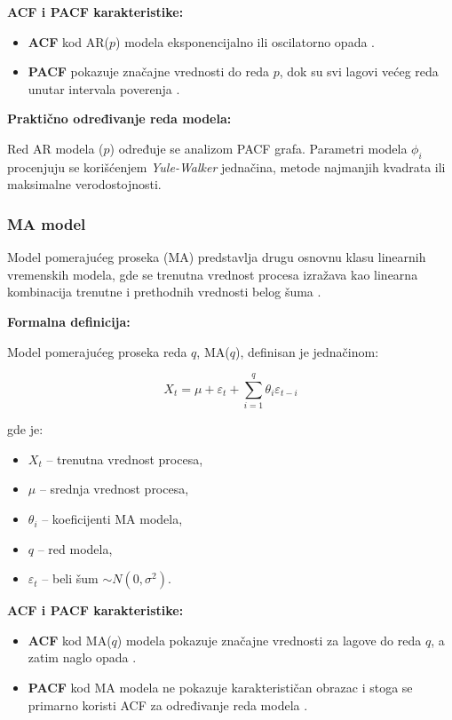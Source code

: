\documentclass[12pt]{article}
\begin{document}
\noindent\textbf{ACF i PACF karakteristike:}

\begin{itemize}
    \item \textbf{ACF} kod AR($p$) modela eksponencijalno ili oscilatorno opada \cite{box1970}.
    \item \textbf{PACF} pokazuje značajne vrednosti do reda $p$, dok su svi lagovi većeg reda unutar intervala poverenja \cite{brockwell2002, hamilton1994}.
\end{itemize}

\noindent\textbf{Praktično određivanje reda modela:}

Red AR modela ($p$) određuje se analizom PACF grafa. Parametri modela $\phi_i$ procenjuju se korišćenjem \textit{Yule-Walker} jednačina, metode najmanjih kvadrata ili maksimalne verodostojnosti.

\vspace{0.5cm}

\subsubsection{MA model}

Model pomerajućeg proseka (MA) predstavlja drugu osnovnu klasu linearnih vremenskih modela, gde se trenutna vrednost procesa izražava kao linearna kombinacija trenutne i prethodnih vrednosti belog šuma \cite{box1970, brockwell2002}.

\noindent\textbf{Formalna definicija:}

Model pomerajućeg proseka reda $q$, MA($q$), definisan je jednačinom:

\begin{equation}
X_t = \mu + \varepsilon_t + \sum_{i=1}^{q} \theta_i \varepsilon_{t-i}
\end{equation}

gde je:
\begin{itemize}
    \item $X_t$ -- trenutna vrednost procesa,
    \item $\mu$ -- srednja vrednost procesa,
    \item $\theta_i$ -- koeficijenti MA modela,
    \item $q$ -- red modela,
    \item $\varepsilon_t$ -- beli šum $\sim N(0, \sigma^2)$.
\end{itemize}

\noindent\textbf{ACF i PACF karakteristike:}

\begin{itemize}
    \item \textbf{ACF} kod MA($q$) modela pokazuje značajne vrednosti za lagove do reda $q$, a zatim naglo opada \cite{box1970}.
    \item \textbf{PACF} kod MA modela ne pokazuje karakterističan obrazac i stoga se primarno koristi ACF za određivanje reda modela \cite{brockwell2002}.
\end{itemize}
\end{document}
